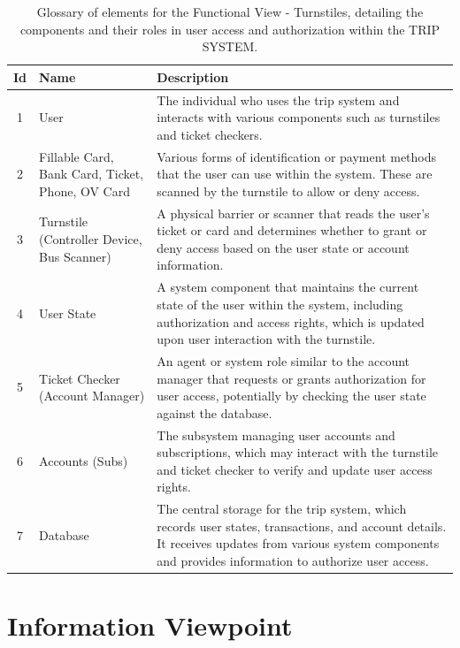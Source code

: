 \begin{table}[H] %
    \centering
    \begin{tabular}{@{}clp{9cm}@{}} %
    \toprule
    \textbf{Id} & \textbf{Name} & \textbf{Description} \\
    \midrule
    1 & User & The individual who uses the trip system and interacts with various components such as turnstiles and ticket checkers. \\
    2 & Fillable Card, Bank Card, Ticket, Phone, OV Card & Various forms of identification or payment methods that the user can use within the system. These are scanned by the turnstile to allow or deny access. \\
    3 & Turnstile (Controller Device, Bus Scanner) & A physical barrier or scanner that reads the user's ticket or card and determines whether to grant or deny access based on the user state or account information. \\
    4 & User State & A system component that maintains the current state of the user within the system, including authorization and access rights, which is updated upon user interaction with the turnstile. \\
    5 & Ticket Checker (Account Manager) & An agent or system role similar to the account manager that requests or grants authorization for user access, potentially by checking the user state against the database. \\
    6 & Accounts (Subs) & The subsystem managing user accounts and subscriptions, which may interact with the turnstile and ticket checker to verify and update user access rights. \\
    7 & Database & The central storage for the trip system, which records user states, transactions, and account details. It receives updates from various system components and provides information to authorize user access. \\
    \bottomrule
    \end{tabular}
    \caption{Glossary of elements for the Functional View - Turnstiles, detailing the components and their roles in user access and authorization within the TRIP SYSTEM.}
    \label{tab:glossary_turnstiles}
\end{table}

\section{Information Viewpoint}

